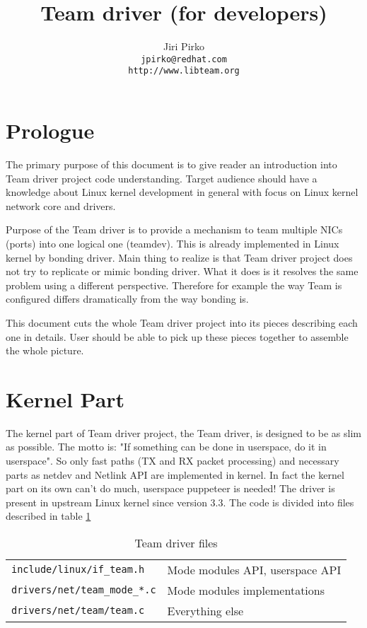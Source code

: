 \documentclass[11pt,a4paper]{article}
\begin{document}
\title{Team driver (for developers)}
\author{Jiri Pirko\\
\texttt{jpirko@redhat.com}\\
\texttt{http://www.libteam.org}}

\maketitle
\newpage

\section{Prologue}
The primary purpose of this document is to give reader an introduction into Team driver project code understanding. Target audience should have a knowledge about Linux kernel development in general with focus on Linux kernel network core and drivers.

Purpose of the Team driver is to provide a mechanism to team multiple NICs (ports) into one logical one (teamdev). This is already implemented in Linux kernel by bonding driver. Main thing to realize is that Team driver project does not try to replicate or mimic bonding driver. What it does is it resolves the same problem using a different perspective. Therefore for example the way Team is configured differs dramatically from the way bonding is.

This document cuts the whole Team driver project into its pieces describing each one in details. User should be able to pick up these pieces together to assemble the whole picture.

\section{Kernel Part}

The kernel part of Team driver project, the Team driver, is designed to be as slim as possible. The motto is: "If something can be done in userspace, do it in userspace". So only fast paths (TX and RX packet processing) and necessary parts as netdev and Netlink API are implemented in kernel. In fact the kernel part on its own can't do much, userspace puppeteer is needed! The driver is present in upstream Linux kernel since version 3.3. The code is divided into files described in table \ref{table1}

\begin{table}[ht]
  \begin{tabular}{ l l }
    \verb+include/linux/if_team.h+ & Mode modules API, userspace API  \\
    \verb+drivers/net/team_mode_*.c+ & Mode modules implementations \\
    \verb+drivers/net/team/team.c+ & Everything else \\
  \end{tabular}
  \caption{Team driver files}
  \label{table1}
\end{table}
\end{document}
